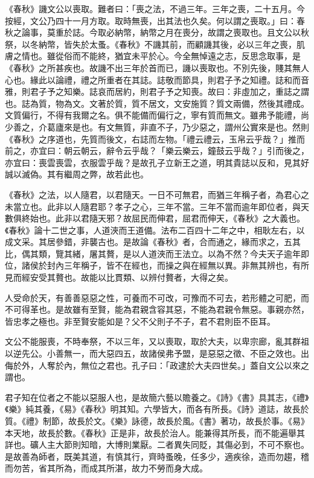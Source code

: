 \begin{pinyinscope}
《春秋》譏文公以喪取。難者曰：「喪之法，不過三年。三年之喪，二十五月。今按經，文公乃四十一月方取。取時無喪，出其法也久矣。何以謂之喪取。」曰：春秋之論事，莫重於誌。今取必納幣，納幣之月在喪分，故謂之喪取也。且文公以秋祭，以冬納幣，皆失於太蚤。《春秋》不譏其前，而顧譏其後，必以三年之喪，肌膚之情也。雖從俗而不能終，猶宜未平於心。今全無悼遠之志，反思念取事，是《春秋》之所甚疾也。故譏不出三年於首而已，譏以喪取也。不別先後，賤其無人心也。緣此以論禮，禮之所重者在其誌。誌敬而節具，則君子予之知禮。誌和而音雅，則君子予之知樂。誌哀而居約，則君子予之知喪。故曰：非虛加之，重誌之謂也。誌為質，物為文。文著於質，質不居文，文安施質？質文兩備，然後其禮成。文質偏行，不得有我爾之名。俱不能備而偏行之，寧有質而無文。雖弗予能禮，尚少善之，介葛廬來是也。有文無質，非直不子，乃少惡之，謂州公實來是也。然則《春秋》之序道也，先質而後文，右誌而左物。「禮云禮云，玉帛云乎哉？」推而前之，亦宜曰：朝云朝云，辭令云乎哉？「樂云樂云，鐘鼓云乎哉？」引而後之，亦宜曰：喪雲喪雲，衣服雲乎哉？是故孔子立新王之道，明其貴誌以反和，見其好誠以滅偽。其有繼周之弊，故若此也。
\end{pinyinscope}


《春秋》之法，以人隨君，以君隨天。一日不可無君，而猶三年稱子者，為君心之未當立也。此非以人隨君耶？孝子之心，三年不當。三年不當而逾年即位者，與天數俱終始也。此非以君隨天邪？故屈民而伸君，屈君而伸天，《春秋》之大義也。《春秋》論十二世之事，人道浹而王道備。法布二百四十二年之中，相耿左右，以成文采。其居參錯，非襲古也。是故論《春秋》者，合而通之，緣而求之，五其比，偶其類，覽其緒，屠其贅，是以人道浹而王法立。以為不然？今夫天子逾年即位，諸侯於封內三年稱子，皆不在經也，而操之與在經無以異。非無其辨也，有所見而經安受其贅也。故能以比貫類、以辨付贅者，大得之矣。


人受命於天，有善善惡惡之性，可養而不可改，可豫而不可去，若形體之可肥，而不可得革也。是故雖有至賢，能為君親含容其惡，不能為君親令無惡。事親亦然，皆忠孝之極也。非至賢安能如是？父不父則子不子，君不君則臣不臣耳。


文公不能服喪，不時奉祭，不以三年，又以喪取，取於大夫，以卑宗廊，亂其群祖以逆先公。小善無一，而大惡四五，故諸侯弗予盟，是惡惡之徵、不臣之效也。出侮於外，人奪於內，無位之君也。孔子曰：「政逮於大夫四世矣。」蓋自文公以來之謂也。


君子知在位者之不能以惡服人也，是故簡六藝以贍養之。《詩》《書》具其志，《禮》《樂》純其養，《易》《春秋》明其知。六學皆大，而各有所長。《詩》道誌，故長於質。《禮》制節，故長於文。《樂》詠德，故長於風。《書》著功，故長於事。《易》本天地，故長於數。《春秋》正是非，故長於治人。能兼得其所長，而不能遍舉其詳也。礦人主大節則知暗，大博則業厭。二者異失同貶，其傷必到，不可不察也。是故善為師者，既美其道，有慎其行，齊時蚤晚，任多少，適疾徐，造而勿趨，稽而勿苦，省其所為，而成其所湛，故力不勞而身大成。


